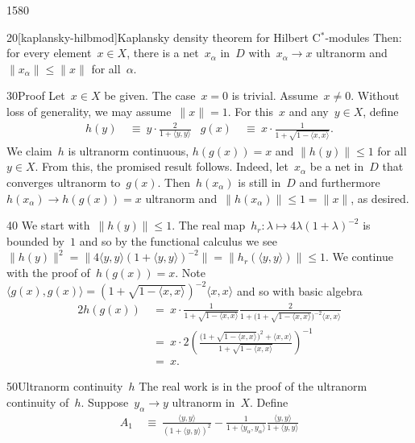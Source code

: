 \begin{parsec}{1580}
\begin{point}{20}[kaplansky-hilbmod]{Kaplansky density theorem for Hilbert C$^*$-modules}
Then: for every element~$x \in X$,
    there is a net~$x_\alpha$ in~$D$
    with~$x_\alpha \to x$ ultranorm
    and~$\|x_\alpha\| \leq \|x\|$ for all~$\alpha$.
\begin{point}{30}{Proof}%
Let~$x \in X$ be given.
The case~$x=0$ is trivial.
Assume~$x \neq 0$.
Without loss of generality, we may assume~$\| x \| = 1$.
For this~$x$ and any~$y \in X$, define
\begin{align*}
    h(y) &\ \equiv \ y \cdot\frac{2}{1+ \langle y, y \rangle}
    &
    g(x) &\ \equiv \ x \cdot\frac{1}{1+ \sqrt{1- \langle x, x\rangle}}.
\end{align*}
We claim~$h$ is ultranorm continuous,
$h(g(x)) = x$ and $\| h(y) \| \leq 1$ for all~$y \in X$.
From this, the promised result follows.
Indeed, let~$x_\alpha$ be a net in~$D$
    that converges ultranorm to~$g(x)$.
Then~$h(x_\alpha)$ is
    still in~$D$
    and furthermore~$h(x_\alpha) \to h(g(x)) = x$ ultranorm
    and~$\| h(x_\alpha) \| \leq 1 = \| x \|$, as desired.
\begin{point}{40}%
We start with~$\| h(y) \| \leq 1$.
The real map~$h_r\colon \lambda \mapsto 4 \lambda (1+\lambda)^{-2}$
    is bounded by~$1$ and so by the functional calculus
    we see~$\| h(y) \|^2 = \| 4 \langle y,y\rangle (1+ \langle y,y\rangle)^{-2} \|
                = \| h_r(\langle y,y\rangle) \|  \leq 1$.
We continue with the proof of~$h(g(x)) = x$.
Note~$\langle g(x), g(x) \rangle
= (1 + \sqrt{1 - \langle x,x \rangle })^{-2} \langle x,x\rangle$
and so with basic algebra
\begin{alignat*}{2}
    h(g(x)) &\ = \ x \cdot
\frac{1}{ 1 + \sqrt{1 - \langle x,x\rangle }}
\frac{2}{1 + \bigl(1 + \sqrt{1 - \langle x,x \rangle }\bigr)^{-2} \langle x,x\rangle} \\
& \ =\  x \cdot 2 \left( \frac{
    \bigl(1 + \sqrt{1-\langle x, x\rangle}\bigr)^2 + \langle x,x \rangle
}{1 + \sqrt{1 - \langle x,x \rangle}} \right)^{-1} \\
& \ = \ x.
\end{alignat*}
\end{point}
\spacingfix{}
\begin{point}{50}{Ultranorm continuity~$h$}%
The real work is in the proof of the ultranorm continuity of~$h$.
Suppose~$y_\alpha \to y$ ultranorm in~$X$. Define
\begin{align*}
    A_1 & \ \equiv \ \frac{\langle y,y\rangle}{(1 + \langle y,y \rangle)^2} 
            - \frac{1}{1+\langle y_\alpha,y_\alpha \rangle} \frac{\langle y,y \rangle}{1+\langle y,y \rangle} \\

\end{align*}
\end{point}
\end{point}
\end{point}
\end{parsec}
